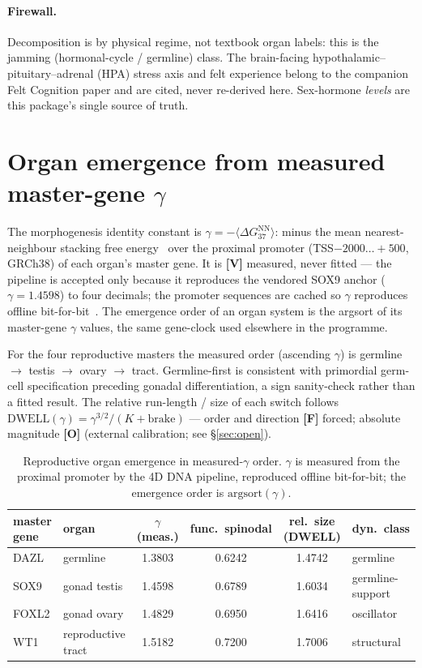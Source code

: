 \documentclass[11pt]{article}
\newcommand{\gradeV}{\textcolor{verified}{\textbf{[V]}}}
\newcommand{\gradeF}{\textcolor{forced}{\textbf{[F]}}}
\newcommand{\gradeO}{\textcolor{open}{\textbf{[O]}}}
\begin{document}
\paragraph{Firewall.} Decomposition is by physical regime, not textbook organ labels: this is the jamming
(hormonal-cycle / germline) class. The brain-facing hypothalamic--pituitary--adrenal (HPA) stress axis and
felt experience belong to the companion Felt Cognition paper and are cited, never re-derived here. Sex-hormone
\emph{levels} are this package's single source of truth.

\section{Organ emergence from measured master-gene \texorpdfstring{$\gamma$}{gamma}}

The morphogenesis identity constant is $\gamma = -\langle\Delta G_{37}^{\mathrm{NN}}\rangle$: minus the mean
nearest-neighbour stacking free energy~\cite{santalucia} over the proximal promoter (TSS$-2000\ldots+500$,
GRCh38) of each organ's master gene. It is \gradeV{} measured, never fitted --- the pipeline is accepted only
because it reproduces the vendored SOX9 anchor ($\gamma=1.4598$) to four decimals; the promoter sequences are
cached so $\gamma$ reproduces offline bit-for-bit~\cite{dnablueprint}. The emergence order of an organ system
is the argsort of its master-gene $\gamma$ values, the same gene-clock used elsewhere in the programme.

For the four reproductive masters the measured order (ascending $\gamma$) is germline $\to$ testis $\to$ ovary $\to$ tract. Germline-first
is consistent with primordial germ-cell specification preceding gonadal differentiation, a sign sanity-check
rather than a fitted result. The relative run-length / size of each switch follows
$\mathrm{DWELL}(\gamma) = \gamma^{3/2}/(K+\mathrm{brake})$ --- order and direction \gradeF{} forced; absolute
magnitude \gradeO{} (external calibration; see \S\ref{sec:open}).

\begin{table}[H]
\centering
\small
\caption{Reproductive organ emergence in measured-$\gamma$ order. $\gamma$ is measured from the proximal promoter by the 4D DNA pipeline, reproduced offline bit-for-bit; the emergence order is $\mathrm{argsort}(\gamma)$.}
\label{tab:organs}
\begin{tabular}{llcccl}
\toprule
master gene & organ & $\gamma$ (meas.) & func.\ spinodal & rel.\ size (DWELL) & dyn.\ class \\
\midrule
DAZL & germline & 1.3803 & 0.6242 & 1.4742 & germline \\
SOX9 & gonad testis & 1.4598 & 0.6789 & 1.6034 & germline-support \\
FOXL2 & gonad ovary & 1.4829 & 0.6950 & 1.6416 & oscillator \\
WT1 & reproductive tract & 1.5182 & 0.7200 & 1.7006 & structural \\
\bottomrule
\end{tabular}
\end{table}
\end{document}
